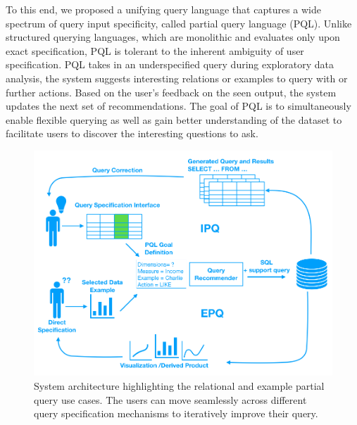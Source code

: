 \documentclass{sig-alternate-05-2015}
\begin{document}
\par To this end, we proposed a unifying query language that captures a wide spectrum of query input specificity, called partial query language (PQL). Unlike structured querying languages, which are monolithic and evaluates only upon exact specification, PQL is tolerant to the inherent ambiguity of user specification. PQL takes in an underspecified query during exploratory data analysis, the system suggests interesting relations or examples to query with or further actions. Based on the user's feedback on the seen output, the system updates the next set of recommendations. The goal of PQL is to simultaneously enable flexible querying as well as gain better understanding of the dataset to facilitate users to discover the interesting questions to ask.
\begin{figure}[ht!]\label{system}
\includegraphics[width=\linewidth]{figures/system.png}
\caption{System architecture highlighting the relational and example partial query use cases. The users can move seamlessly across different query specification mechanisms to iteratively improve their query.}
\end{figure}
\end{document}
